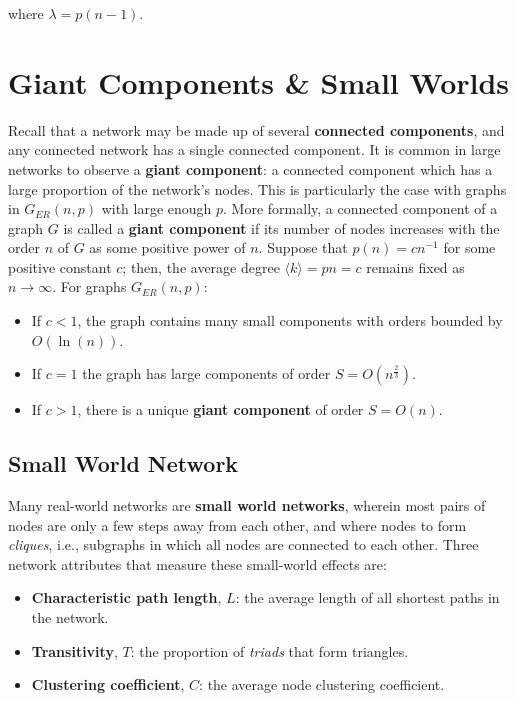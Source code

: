 \documentclass[a4paper,11pt]{article}
\begin{document}
where $\lambda = p(n-1)$.

\section{Giant Components \& Small Worlds}
Recall that a network may be made up of several \textbf{connected components}, and any connected network has a single connected component.
It is common in large networks to observe a \textbf{giant component}: a connected component which has a large proportion of the network's nodes.
This is particularly the case with graphs in $G_{ER}(n,p)$ with large enough $p$.
More formally, a connected component of a graph $G$ is called a \textbf{giant component} if its number of nodes increases with the order $n$ of $G$ as some positive power of $n$.
Suppose that $p(n) = cn^{-1}$ for some positive constant $c$;
then, the average degree $\langle k \rangle = pn = c$ remains fixed as $n \to \infty$.
For graphs $G_{ER}(n,p)$:
\begin{itemize}
    \item   If $c < 1$, the graph contains many small components with orders bounded by $O(\ln(n))$.
    \item   If $c=1$ the graph has large components of order $S = O(n^\frac{2}{3})$.
    \item   If $c > 1$, there is a unique \textbf{giant component} of order $S = O(n)$.
\end{itemize}

\subsection{Small World Network}
Many real-world networks are \textbf{small world networks}, wherein most pairs of nodes are only a few steps away from each other, and where nodes to form \textit{cliques}, i.e., subgraphs in which all nodes are connected to each other.
Three network attributes that measure these small-world effects are:
\begin{itemize}
    \item   \textbf{Characteristic path length}, $L$: the average length of all shortest paths in the network.
    \item   \textbf{Transitivity}, $T$: the proportion of \textit{triads} that form triangles.
    \item   \textbf{Clustering coefficient}, $C$: the average node clustering coefficient.
\end{itemize}
\end{document}
